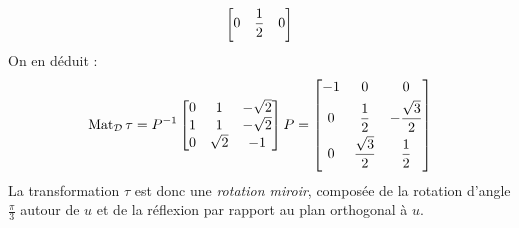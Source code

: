 \begin{enumerate}
\begin{enumerate}
\begin{displaymath}
\begin{bmatrix}
0 & \dfrac{1}{2} & 0 \vspace{3pt}
\end{bmatrix}
\end{displaymath}
On en déduit :
\begin{displaymath}
\Mat_{\mathcal D}\tau =
P^{-1}\begin{bmatrix}
 0 & 1 & -\sqrt{2} \\
1 & 1 & -\sqrt{2} \\
0 & \sqrt{2} & -1
\end{bmatrix}
P 
=
\begin{bmatrix}
 -1 & 0 & 0 \vspace{3pt}\\
 0 & \dfrac{1}{2} & -\dfrac{\sqrt{3}}{2} \vspace{3pt}\\
 0 & \dfrac{\sqrt{3}}{2} & \dfrac{1}{2} \vspace{3pt}
\end{bmatrix}
\end{displaymath}
La transformation $\tau$ est donc une \emph{rotation miroir}, composée de la rotation d'angle $\frac{\pi}{3}$ autour de $u$ et de la réflexion par rapport au plan orthogonal à $u$.
\end{enumerate}
\end{enumerate}

